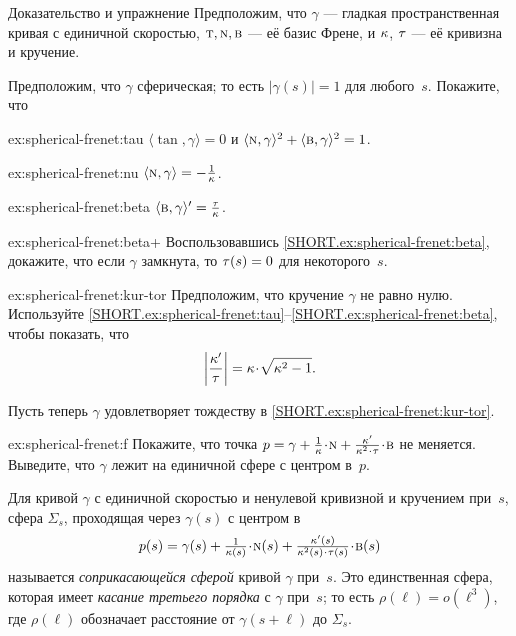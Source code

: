 \begin{thm}{Доказательство и упражнение}\label{ex:spherical-frenet}
Предположим, что $\gamma$ --- гладкая пространственная кривая с единичной скоростью,
$\text{\sc{t}},\text{\sc{n}},\text{\sc{b}}$ --- её базис Френе,
и $\kappa$, $\tau$ --- её кривизна и кручение.

\smallskip

Предположим, что $\gamma$ сферическая; то есть $|\gamma(s)|=1$ для любого~$s$.
Покажите, что

\begin{subthm}{ex:spherical-frenet:tau} $\langle\tan,\gamma\rangle=0$ и $\langle\text{\sc{n}},\gamma\rangle^2+\langle\text{\sc{b}},\gamma\rangle^2=1$.
\end{subthm}

\begin{subthm}{ex:spherical-frenet:nu} $\langle\text{\sc{n}},\gamma\rangle=-\tfrac1{\kappa}$.
\end{subthm}

\begin{subthm}{ex:spherical-frenet:beta} $\langle\text{\sc{b}},\gamma\rangle'=\tfrac{\tau}{\kappa}$.
\end{subthm}

\begin{subthm}{ex:spherical-frenet:beta+}
Воспользовавшись \ref{SHORT.ex:spherical-frenet:beta}, докажите, что если $\gamma$ замкнута, то $\tau(s)=0$ для некоторого~$s$.
\end{subthm}

\begin{subthm}{ex:spherical-frenet:kur-tor} Предположим, что кручение $\gamma$ не равно нулю.
Используйте \ref{SHORT.ex:spherical-frenet:tau}--\ref{SHORT.ex:spherical-frenet:beta}, чтобы показать, что
\[\left|\frac{\kur'}{\tor}\right|=\kur\cdot\sqrt{\kur^2-1}.\]
\end{subthm}
Пусть теперь $\gamma$ удовлетворяет тождеству в \ref{SHORT.ex:spherical-frenet:kur-tor}.
\begin{subthm}{ex:spherical-frenet:f}
Покажите, что точка $p=\gamma+\tfrac1\kur\cdot \norm+\tfrac{\kur'}{\kur^2\cdot\tor}\cdot\bi$ не меняется.
Выведите, что $\gamma$ лежит на единичной сфере с центром в~$p$.
\end{subthm}

\end{thm}

Для кривой $\gamma$ с единичной скоростью и ненулевой кривизной и кручением при~$s$,
сфера $\Sigma_s$, проходящая через $\gamma(s)$ с центром в
\[p(s)=\gamma(s)+\tfrac1{\kur(s)}\cdot \norm(s)+\tfrac{\kur'(s)}{\kur^2(s)\cdot\tor(s)}\cdot\bi(s)\]
называется \emph{соприкасающейся сферой} кривой $\gamma$ при~$s$.
Это единственная сфера, которая имеет \emph{касание третьего порядка} с $\gamma$ при~$s$;
то есть $\rho(\ell)=o(\ell^3)$, где $\rho(\ell)$ обозначает расстояние от $\gamma(s+\ell)$ до $\Sigma_s$.
 
